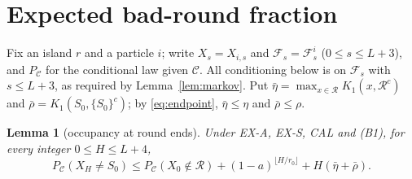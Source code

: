 \documentclass[11pt]{article}
\newtheorem{lemma}[theorem]{Lemma}
\theoremstyle{remark}
\newcommand{\R}{\mathcal R}
\newcommand{\C}{\mathcal C}
\newcommand{\Pc}{P_{\C}}
\begin{document}
\section{Expected bad-round fraction}

Fix an island $r$ and a particle $i$; write $X_s=X_{i,s}$ and $\mathcal F_s=\mathcal F^i_s$ ($0\le s\le L+3$), and $\Pc$ for the conditional law given $\C$. All conditioning below is on $\mathcal F_s$ with $s\le L+3$, as required by Lemma~\ref{lem:markov}.
Put $\bar\eta=\max_{x\in\R}K_1(x,\R^c)$ and $\bar\rho=K_1(S_0,\{S_0\}^c)$; by \eqref{eq:endpoint}, $\bar\eta\le\eta$ and $\bar\rho\le\rho$.

\begin{lemma}[occupancy at round ends]\label{lem:occ}
Under EX-A, EX-S, CAL and (B1), for every integer $0\le H\le L+4$,
\[
\Pc(X_H\neq S_0)\le\Pc(X_0\notin\R)+(1-a)^{\lfloor H/r_0\rfloor}+H(\bar\eta+\bar\rho).
\]
\end{lemma}
\end{document}
